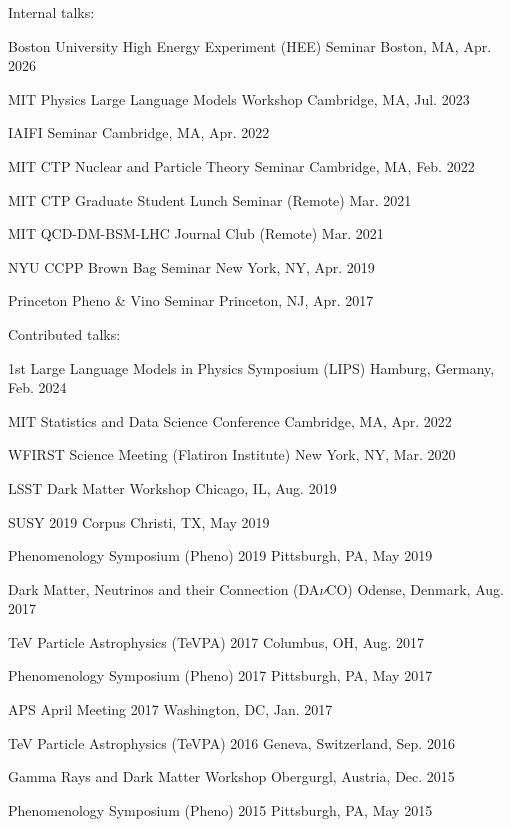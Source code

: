 \documentclass[letterpaper,11pt]{article}
\newenvironment{packed_itemize}{
\begin{itemize}[label=\raisebox{0.25ex}{\tiny$\bullet$}, topsep=0pt, partopsep=0pt]
  \setlength{\itemsep}{4.0pt}
  \setlength{\parskip}{0pt}
  \setlength{\parsep}{0pt}}{\end{itemize}
}
\begin{document}
\noindent
Internal talks:
\begin{packed_itemize}
  \item Boston University High Energy Experiment (HEE) Seminar \hfill Boston, MA, Apr. 2026
  \item MIT Physics Large Language Models Workshop \hfill Cambridge, MA, Jul. 2023
  \item IAIFI Seminar \hfill Cambridge, MA, Apr. 2022
  \item MIT CTP Nuclear and Particle Theory Seminar \hfill Cambridge, MA, Feb. 2022
  \item MIT CTP Graduate Student Lunch Seminar (Remote) \hfill Mar. 2021
  \item MIT QCD-DM-BSM-LHC Journal Club (Remote) \hfill Mar. 2021
  \item NYU CCPP Brown Bag Seminar \hfill New York, NY, Apr. 2019
  \item Princeton Pheno \& Vino Seminar \hfill Princeton, NJ, Apr. 2017
\end{packed_itemize}

\vspace{2mm}

\noindent
Contributed talks:
\begin{packed_itemize}
  \item 1st Large Language Models in Physics Symposium (LIPS)  \hfill Hamburg, Germany, Feb. 2024
  \item MIT Statistics and Data Science Conference  \hfill Cambridge, MA, Apr. 2022
  \item WFIRST Science Meeting (Flatiron Institute) \hfill New York, NY, Mar. 2020
  \item LSST Dark Matter Workshop \hfill Chicago, IL, Aug. 2019
  \item SUSY 2019 \hfill Corpus Christi, TX, May 2019
  \item Phenomenology Symposium (Pheno) 2019 \hfill Pittsburgh, PA, May 2019
  \item Dark Matter, Neutrinos and their Connection (DA$\nu$CO) \hfill Odense, Denmark, Aug. 2017
  \item TeV Particle Astrophysics (TeVPA) 2017 \hfill Columbus, OH, Aug. 2017 
  \item Phenomenology Symposium (Pheno) 2017 \hfill Pittsburgh, PA, May 2017 
  \item APS April Meeting 2017 \hfill Washington, DC, Jan. 2017 
  \item TeV Particle Astrophysics (TeVPA) 2016 \hfill Geneva, Switzerland, Sep. 2016 
  \item Gamma Rays and Dark Matter Workshop \hfill Obergurgl, Austria, Dec. 2015
  \item Phenomenology Symposium (Pheno) 2015 \hfill Pittsburgh, PA, May 2015
\end{packed_itemize}
\end{document}
